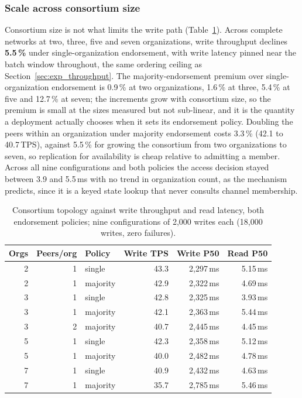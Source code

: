 \documentclass[preprint,12pt]{elsarticle}
\begin{document}
\subsubsection{Scale across consortium size}
\label{sec:exp_netscale}

Consortium size is not what limits the write path (Table~\ref{tab:netscale}).
Across complete networks at
two, three, five and seven organizations, write throughput declines
\textbf{5.5\,\%} under single-organization endorsement, with write latency
pinned near the batch window throughout, the same ordering ceiling as
Section~\ref{sec:exp_throughput}. The majority-endorsement premium over
single-organization endorsement is 0.9\,\% at two organizations, 1.6\,\% at
three, 5.4\,\% at five and 12.7\,\% at seven; the increments grow with
consortium size, so the premium is small at the sizes measured but not
sub-linear, and it is the quantity a deployment actually chooses when it sets
its endorsement policy. Doubling the peers within an organization under
majority endorsement costs 3.3\,\% (42.1 to 40.7\,TPS), against 5.5\,\% for
growing the consortium from two organizations to seven, so replication for
availability is cheap relative to admitting a member. Across all nine
configurations and both policies the access decision stayed between 3.9 and
5.5\,ms with no trend in organization count, as the mechanism predicts, since
it is a keyed state lookup that never consults channel membership.

\begin{table}[!t]
\centering
\caption{Consortium topology against write throughput and read latency,
both endorsement policies; nine configurations of 2{,}000 writes each
(18{,}000 writes, zero failures).}
\label{tab:netscale}
\footnotesize
\setlength{\tabcolsep}{5pt}
\begin{tabular}{@{}rrlrrr@{}}
\toprule
Orgs & Peers/org & Policy & Write TPS & Write P50 & Read P50 \\
\midrule
2 & 1 & single   & 43.3 & 2{,}297\,ms & 5.15\,ms \\
2 & 1 & majority & 42.9 & 2{,}322\,ms & 4.69\,ms \\
3 & 1 & single   & 42.8 & 2{,}325\,ms & 3.93\,ms \\
3 & 1 & majority & 42.1 & 2{,}363\,ms & 5.44\,ms \\
3 & 2 & majority & 40.7 & 2{,}445\,ms & 4.45\,ms \\
5 & 1 & single   & 42.3 & 2{,}358\,ms & 5.12\,ms \\
5 & 1 & majority & 40.0 & 2{,}482\,ms & 4.78\,ms \\
7 & 1 & single   & 40.9 & 2{,}432\,ms & 4.63\,ms \\
7 & 1 & majority & 35.7 & 2{,}785\,ms & 5.46\,ms \\
\bottomrule
\end{tabular}
\end{table}
\end{document}
